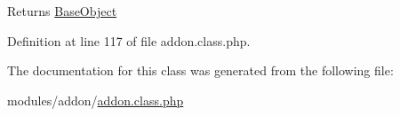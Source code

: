 \begin{DoxyReturn}{Returns}
\hyperlink{classBaseObject}{Base\-Object} 
\end{DoxyReturn}


Definition at line 117 of file addon.\-class.\-php.



The documentation for this class was generated from the following file\-:\begin{DoxyCompactItemize}
\item 
modules/addon/\hyperlink{addon_8class_8php}{addon.\-class.\-php}\end{DoxyCompactItemize}
